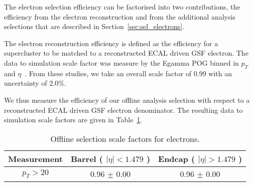 
The electron selection efficiency can be factorised into two contributions,
the efficiency from the electron reconstruction and from the additional
analysis selections that are described in Section~\ref{sec:sel_electrons}.

The electron reconstruction efficiency is defined as the efficiency for a
supercluster to be matched to a reconstructed ECAL driven GSF electron.
The data to simulation scale factor was measure by the Egamma POG binned in
$p_T$ and $\eta$~\cite{ref:egamma_eff_gsf}. From these studies, we take an overall scale factor of
$0.99$ with an uncertainty of $2.0\%$.

We thus measure the efficiency of our offline analysis selection 
with respect to a reconstructed ECAL driven GSF electron denominator. 
The resulting data to simulation scale factors are given in Table~\ref{tab:eff_ele_offline}.


\begin{table}[!ht]
\begin{center}
\begin{tabular}{c|c|c}
\hline
Measurement & Barrel ( $|\eta|<1.479$ )   & Endcap ( $|\eta|>1.479$ )  \\ 
\hline
$  p_T>     20$ & 0.96 $\pm$ 0.00  & 0.96 $\pm$ 0.00  \\ \hline 
\end{tabular}
\caption{Offline selection scale factors for electrons.}
\label{tab:eff_ele_offline}
\end{center}
\end{table}

